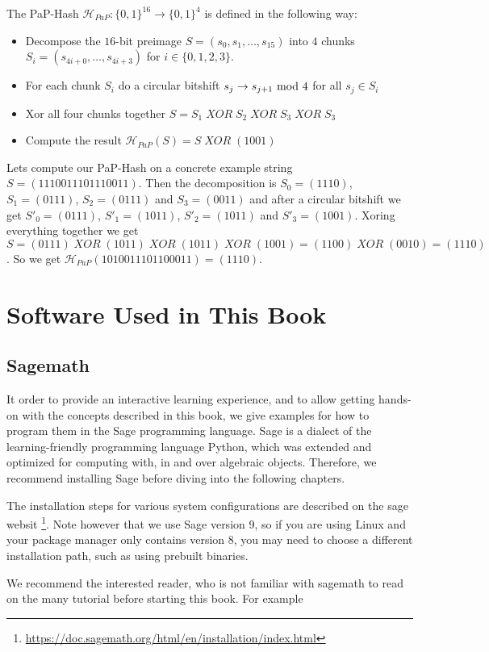 The PaP-Hash $\mathcal{H}_{PaP}: \{0,1\}^{16}\to \{0,1\}^4$ is defined in the following way:
\begin{itemize}
\item Decompose the $16$-bit preimage $S=(s_0,s_1,\ldots,s_{15})$ into $4$ chunks $S_i=(s_{4i+0},\ldots,s_{4i+3})$ for $i\in \{0,1,2,3\}$.
\item For each chunk $S_i$ do a circular bitshift $s_{j}\to s_{j+1} \text{ mod } 4$ for all $s_j\in S_i$
\item Xor all four chunks together $S = S_1\; XOR \; S_2\; XOR \; S_3\; XOR \; S_3$
\item Compute the result $\mathcal{H}_{PaP}(S) = S \; XOR\; (1001)$
\end{itemize}

\begin{example}
Lets compute our PaP-Hash on a concrete example string $S=(1110011101110011)$. Then the decomposition is $S_0=(1110)$, $S_1=(0111)$, $S_2=(0111)$ and $S_3=(0011)$ and after a circular bitshift we get $S'_0=(0111)$, $S'_1=(1011)$, $S'_2=(1011)$ and $S'_3=(1001)$. Xoring everything together we get $S= (0111) \; XOR \; (1011)\; XOR \; (1011)\; XOR \; (1001) = (1100) \; XOR\;
(0010) = (1110)$. So we get $\mathcal{H}_{PaP}(1010 0111 0110 0011) = (1110)$.
\end{example}


\section{Software Used in This Book}

\subsection{Sagemath}
\label{sagemath_setup}
It order to provide an interactive learning experience, and to allow getting hands-on with the concepts described in this book, we give examples for how to program them in the Sage programming language. Sage is a dialect of the learning-friendly programming language Python, which was extended and optimized for computing with, in and over algebraic objects. Therefore, we recommend installing Sage before diving into the following chapters.

The installation steps for various system configurations are described on the sage websit \footnote{\url{https://doc.sagemath.org/html/en/installation/index.html}}. Note however that we use Sage version 9, so if you are using Linux and your package manager only contains version 8, you may need to choose a different installation path, such as using prebuilt binaries.

We recommend the interested reader, who is not familiar with sagemath to read on the many tutorial before starting this book. For example 



